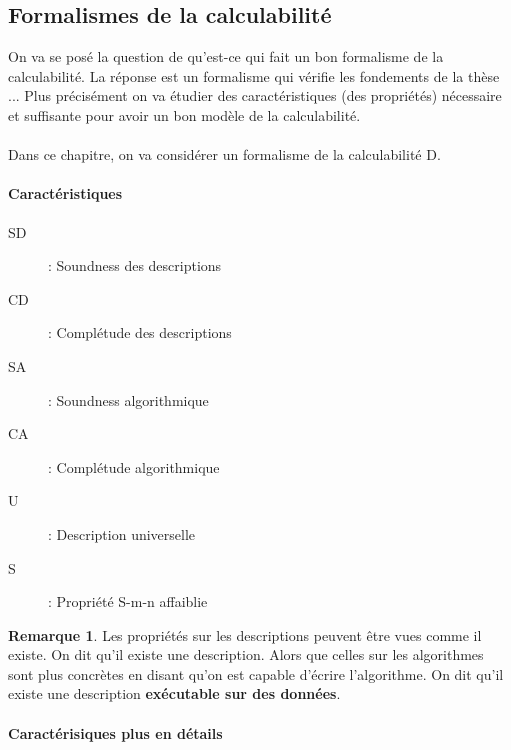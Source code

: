\documentclass[11pt,a4paper]{article}
\theoremstyle{definition}
\newtheorem{myrem}[mydef]{Remarque}
\begin{document}
\subsection{Formalismes de la calculabilité}
\label{sub:formalismes_de_la_calculabilit_}
On va se posé la question de qu'est-ce qui fait un bon formalisme de la 
calculabilité. La réponse est un formalisme qui vérifie les fondements de la 
thèse ... Plus précisément on va étudier des caractéristiques (des propriétés) 
nécessaire et suffisante pour avoir un bon modèle de la calculabilité.

\paragraph{} Dans ce chapitre, on va considérer un formalisme de la 
calculabilité D.

\paragraph{Caractéristiques} 
\begin{description}
	\item[SD] : Soundness des descriptions
	\item[CD] : Complétude des descriptions
	\item[SA] : Soundness algorithmique
	\item[CA] : Complétude algorithmique
	\item[U] : Description universelle
	\item[S] : Propriété S-m-n affaiblie
\end{description}

\begin{myrem}
	Les propriétés sur les descriptions peuvent être vues comme il existe. On 
	dit qu'il existe une description.
	Alors que celles sur les algorithmes sont plus concrètes en disant qu'on 
	est capable d'écrire l'algorithme. On dit qu'il existe une description 
	\textbf{exécutable sur des données}.
\end{myrem}

\paragraph{Caractérisiques plus en détails}
\end{document}
